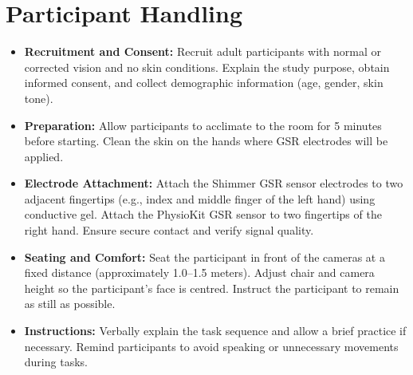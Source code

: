 \documentclass{article}
\begin{document}
\section{Participant Handling}
\begin{itemize}
    \item \textbf{Recruitment and Consent:} Recruit adult participants with normal or corrected vision and no skin conditions. Explain the study purpose, obtain informed consent, and collect demographic information (age, gender, skin tone).
    \item \textbf{Preparation:} Allow participants to acclimate to the room for 5 minutes before starting. Clean the skin on the hands where GSR electrodes will be applied.
    \item \textbf{Electrode Attachment:} Attach the Shimmer GSR sensor electrodes to two adjacent fingertips (e.g., index and middle finger of the left hand) using conductive gel. Attach the PhysioKit GSR sensor to two fingertips of the right hand. Ensure secure contact and verify signal quality.
    \item \textbf{Seating and Comfort:} Seat the participant in front of the cameras at a fixed distance (approximately 1.0–1.5 meters). Adjust chair and camera height so the participant’s face is centred. Instruct the participant to remain as still as possible.
    \item \textbf{Instructions:} Verbally explain the task sequence and allow a brief practice if necessary. Remind participants to avoid speaking or unnecessary movements during tasks.
\end{itemize}
\end{document}
